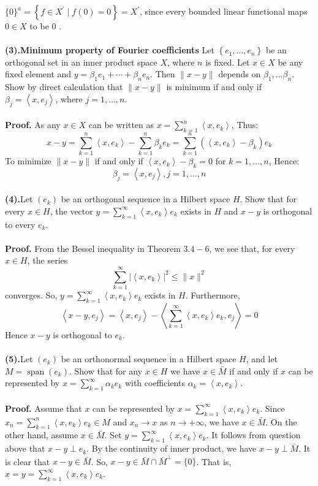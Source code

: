 \documentclass{homework}
\begin{document}
$\{0\}^a=\left\{f \in X^{\prime} \mid f(0)=0\right\}=X^{\prime}$, since every bounded linear functional maps $0 \in X$ to be 0 .
\\
\\
\textbf{(3).Minimum property of Fourier coefficients} Let $\left\{e_1, \ldots, e_n\right\}$ be an orthogonal set in an inner product space $X$, where $n$ is fixed. Let $x \in X$ be any fixed element and $y=\beta_1 e_1+\cdots+\beta_n e_n$. Then $\|x-y\|$ depends on $\beta_1, \ldots \beta_n$. Show by direct calculation that $\|x-y\|$ is minimum if and only if $\beta_j=\left\langle x, e_j\right\rangle$, where $j=1, \ldots, n$.
\\
\\
\textbf{Proof.} As any $x \in X$ can be written as $x=\sum_{k=1}^n \left\langle x, e_k\right\rangle $, Thus:
$$
x-y=\sum_{k=1}^n\left\langle x, e_k\right\rangle-\sum_{k=1}^n\beta_k e_k=\sum_{k=1}^n(\left\langle x, e_k\right\rangle-\beta_k)e_k
$$
To minimize $\|x-y\|$ if and only if $\left\langle x, e_k\right\rangle-\beta_k=0$ for $k=1, \ldots, n$, Hence:
$$
\beta_j=\left\langle x,e_j\right\rangle, j=1, \ldots, n
$$
\\
\textbf{(4).}Let $\left(e_k\right)$ be an orthogonal sequence in a Hilbert space $H$. Show that for every $x \in H$, the vector $y=\sum_{k=1}^{\infty}\left\langle x, e_k\right\rangle e_k$ exists in $H$ and $x-y$ is orthogonal to every $e_k$.
\\
\\
\textbf{Proof.} From the Bessel inequality in Theorem $3.4-6$, we see that, for every $x \in H$, the series
$$
\sum_{k=1}^{\infty}\left|\left\langle x, e_k\right\rangle\right|^2 \leq\|x\|^2
$$
converges. So, $y=\sum_{k=1}^{\infty}\left\langle x, e_k\right\rangle e_k$ exists in $H$. Furthermore,
$$
\left\langle x-y, e_j\right\rangle=\left\langle x, e_j\right\rangle-\left\langle\sum_{k=1}^{\infty}\left\langle x, e_k\right\rangle e_k, e_j\right\rangle=0
$$
Hence $x-y$ is orthogonal to $e_k$.
\\
\\
\textbf{(5).}Let $\left(e_k\right)$ be an orthonormal sequence in a Hilbert space $H$, and let $M=\operatorname{span}\left(e_k\right)$. Show that for any $x \in H$ we have $x \in \bar{M}$ if and only if $x$ can be represented by $x=\sum_{k=1}^{\infty} \alpha_k e_k$ with coefficients $\alpha_k=\left\langle x, e_k\right\rangle$.
\\
\\
\textbf{Proof.} Assume that $x$ can be represented by $x=\sum_{k=1}^{\infty}\left\langle x, e_k\right\rangle e_k$. Since $x_n=\sum_{k=1}^n\left\langle x, e_k\right\rangle e_k \in M$ and $x_n \rightarrow x$ as $n \rightarrow+\infty$, we have $x \in \bar{M}$. On the other hand, assume $x \in \bar{M}$. Set $y=\sum_{k=1}^{\infty}\left\langle x, e_k\right\rangle e_k$. It follows from question above that $x-y \perp e_k$. By the continuity of inner product, we have $x-y \perp \bar{M}$. It is clear that $x-y \in \bar{M}$. So, $x-y \in \bar{M} \cap \bar{M}^{\perp}=\{0\}$. That is, $x=y=\sum_{k=1}^{\infty}\left\langle x, e_k\right\rangle e_k$.
\end{document}
